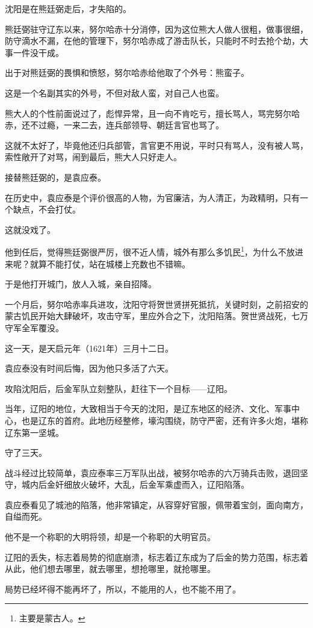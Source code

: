 \begin{multicols}{\theparacolNo}
沈阳是在熊廷弼走后，才失陷的。

熊廷弼驻守辽东以来，努尔哈赤十分消停，因为这位熊大人做人很粗，做事很细，防守滴水不漏，在他的管理下，努尔哈赤成了游击队长，只能时不时去抢个劫，大事一件没干成。

出于对熊廷弼的畏惧和愤怒，努尔哈赤给他取了个外号：熊蛮子。

这是一个名副其实的外号，不但对敌人蛮，对自己人也蛮。

熊大人的个性前面说过了，彪悍异常，且一向不肯吃亏，擅长骂人，骂完努尔哈赤，还不过瘾，一来二去，连兵部领导、朝廷言官也骂了。

这就不太好了，毕竟他还归兵部管，言官更不用说，平时只有骂人，没有被人骂，索性敞开了对骂，闹到最后，熊大人只好走人。

接替熊廷弼的，是袁应泰。

在历史中，袁应泰是个评价很高的人物，为官廉洁，为人清正，为政精明，只有一个缺点，不会打仗。

这就没戏了。

他到任后，觉得熊廷弼很严厉，很不近人情，城外有那么多饥民\footnote{主要是蒙古人。}，为什么不放进来呢？就算不能打仗，站在城楼上充数也不错嘛。

于是他打开城门，放人入城，亲自招降。

一个月后，努尔哈赤率兵进攻，沈阳守将贺世贤拼死抵抗，关键时刻，之前招安的蒙古饥民开始大肆破坏，攻击守军，里应外合之下，沈阳陷落。贺世贤战死，七万守军全军覆没。

这一天，是天启元年（1621年）三月十二日。

袁应泰没有时间后悔，因为他只多活了六天。

攻陷沈阳后，后金军队立刻整队，赶往下一个目标——辽阳。

当年，辽阳的地位，大致相当于今天的沈阳，是辽东地区的经济、文化、军事中心，也是辽东的首府。此地历经整修，壕沟围绕，防守严密，还有许多火炮，堪称辽东第一坚城。

守了三天。

战斗经过比较简单，袁应泰率三万军队出战，被努尔哈赤的六万骑兵击败，退回坚守，城内后金奸细放火破坏，大乱，后金军乘虚而入，辽阳陷落。

袁应泰看见了城池的陷落，他非常镇定，从容穿好官服，佩带着宝剑，面向南方，自缢而死。

他不是一个称职的大明将领，却是一个称职的大明官员。

辽阳的丢失，标志着局势的彻底崩溃，标志着辽东成为了后金的势力范围，标志着从此，他们想去哪里，就去哪里，想抢哪里，就抢哪里。

局势已经坏得不能再坏了，所以，不能用的人，也不能不用了。


\end{multicols}
